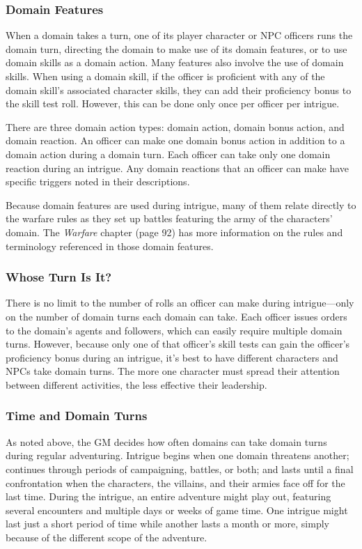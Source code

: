 \documentclass[10pt,a4paper,twoside,bg=print,twocolumn,openany,nodeprecatedcode]{dndbook}
\begin{document}
\subsubsection{Domain Features}
When a domain takes a turn, one of its player character or NPC officers runs the domain turn, directing the domain to make use of its domain features, or to use domain skills as a domain action. Many features also involve the use of domain skills. When using a domain skill, if the officer is proficient with any of the domain skill's associated character skills, they can add their proficiency bonus to the skill test roll. However, this can be done only once per officer per intrigue.

There are three domain action types: domain action, domain bonus action, and domain reaction. An officer can make one domain bonus action in addition to a domain action during a domain turn. Each officer can take only one domain reaction during an intrigue. Any domain reactions that an officer can make have specific triggers noted in their descriptions.

Because domain features are used during intrigue, many of them relate directly to the warfare rules as they set up battles featuring the army of the characters' domain. The \textit{Warfare} chapter (page 92) has more information on the rules and terminology referenced in those domain features.

\subsubsection{Whose Turn Is It?}
There is no limit to the number of rolls an officer can make during intrigue—only on the number of domain turns each domain can take. Each officer issues orders to the domain's agents and followers, which can easily require multiple domain turns. However, because only one of that officer's skill tests can gain the officer's proficiency bonus during an intrigue, it's best to have different characters and NPCs take domain turns. The more one character must spread their attention between different activities, the less effective their leadership.

\subsubsection{Time and Domain Turns}
As noted above, the GM decides how often domains can take domain turns during regular adventuring. Intrigue begins when one domain threatens another; continues through periods of campaigning, battles, or both; and lasts until a final confrontation when the characters, the villains, and their armies face off for the last time. During the intrigue, an entire adventure might play out, featuring several encounters and multiple days or weeks of game time. One intrigue might last just a short period of time while another lasts a month or more, simply because of the different scope of the adventure.
\end{document}
